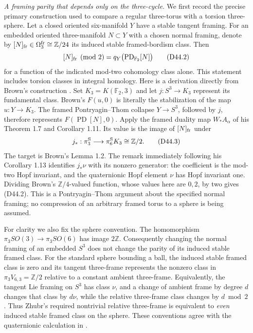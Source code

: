 \emph{A framing parity that depends only on the three-cycle.}
We first record the precise primary construction used to compare a
regular three-torus with a torsion three-sphere.
Let a closed oriented six-manifold $Y$ have a stable tangent framing.
For an embedded oriented three-manifold $N\subset Y$ with a chosen
normal framing, denote by $[N]_{\rm fr}\in\Omega^{\rm fr}_3
\cong\mathbb Z/24$ its induced stable framed-bordism class. Then
\[
 [N]_{\rm fr}\pmod2
   =q_Y\bigl(\operatorname{PD}_{\mathbb F_2}[N]\bigr)             \tag{D44.2}
\]
for a function of the indicated mod-two cohomology class alone.
This statement includes torsion classes in integral homology.
Here is a derivation directly from Brown's construction
\cite[pp.369--372]{ffBrown72}. Set $K_3=K(\mathbb F_2,3)$ and let
$j:S^3\to K_3$ represent its fundamental class. Brown's $F(u,0)$
is literally the stabilization of the map $u:Y\to K_3$.
The framed Pontryagin--Thom collapse $Y\to S^3$, followed by $j$,
therefore represents $F(\operatorname{PD}[N],0)$.
Apply the framed duality map $W_*A_\alpha$ of his Theorem 1.7 and
Corollary 1.11. Its value is the image of $[N]_{\rm fr}$ under
\[
 j_*:\pi_3^{\rm S}\longrightarrow\pi_6^{\rm S}K_3
          \cong\mathbb Z/2.                                  \tag{D44.3}
\]
The target is Brown's Lemma 1.2. The remark immediately following
his Corollary 1.13 identifies $j_*\nu$ with its nonzero generator:
the coefficient is the mod-two Hopf invariant, and the quaternionic
Hopf element $\nu$ has Hopf invariant one. Dividing Brown's
$\mathbb Z/4$-valued function, whose values here are $0,2$, by two
gives (D44.2). This is a Pontryagin--Thom argument about the specified
normal framing; no compression of an arbitrary framed torus to a
sphere is being assumed.

For clarity we also fix the sphere convention. The homomorphism
$\pi_3SO(3)\to\pi_3SO(6)$ has image $2\mathbb Z$.
Consequently changing the normal framing of an embedded $S^3$
does not change the parity of its induced stable framed class.
For the standard sphere bounding a ball, the induced stable framed
class is zero and its tangent three-frame represents the nonzero
class in $\pi_3V_{6,3}=\mathbb Z/2$ relative to a constant ambient
three-frame. Equivalently, the tangent Lie framing on $S^3$ has
class $\nu$, and a change of ambient frame by degree $d$ changes
that class by $d\nu$, while the relative three-frame class changes
by $d\bmod2$. Thus Zhubr's required nontrivial relative
three-frame is equivalent to \emph{even} induced stable framed
class on the sphere. These conventions agree with the quaternionic
calculation in \cite[Section 5]{ffZhubr13}.

